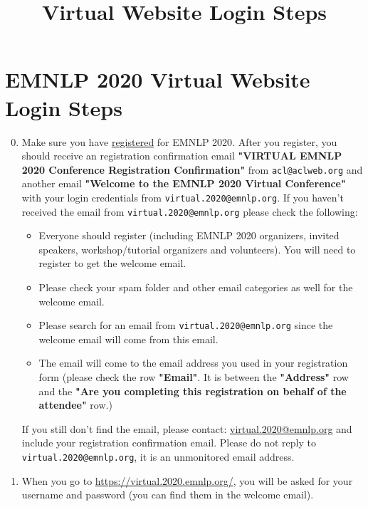 \documentclass[11pt]{scrartcl}
\title{\conferenceName Virtual Website Login Steps}
\makeatletter
\newcommand{\conferenceName}{EMNLP 2020\xspace}
\newcommand{\registrationUrl}{https://aclweb.org/conference/virtual-emnlp-2020-conference-registration/}
\newcommand{\virtualConferenceUrl}{https://virtual.2020.emnlp.org/}
\newcommand{\loginCredentialEmail}{virtual.2020@emnlp.org}
\newcommand{\helpdeskEmail}{virtual.2020@emnlp.org}
\makeatother
\begin{document}
\section*{\conferenceName Virtual Website Login Steps}
	
\begin{enumerate}
	\setcounter{enumi}{-1}
	\item
		\label{step:registration}
		\begin{sloppypar}
			Make sure you have \href{\registrationUrl}{registered} for \conferenceName. After you register, you should receive an registration confirmation email \textbf{"VIRTUAL \conferenceName Conference Registration Confirmation"} from \nolinkurl{acl@aclweb.org} and another email \textbf{"Welcome to the \conferenceName Virtual Conference"} with your login credentials from \nolinkurl{\loginCredentialEmail}. If you haven't received the email from \nolinkurl{\loginCredentialEmail} please check the following:
			
			\begin{itemize}
				\item Everyone should register (including \conferenceName organizers, invited speakers, workshop/tutorial organizers and volunteers). You will need to register to get the welcome email.
				\item Please check your spam folder and other email categories as well for the welcome email.
				\item Please search for an email from \nolinkurl{\loginCredentialEmail} since the welcome email will come from this email.
				\item The email will come to the email address you used in your registration form (please check the row \textbf{"Email"}. It is between the \textbf{"Address"} row and the \textbf{"Are you completing this registration on behalf of the attendee"} row.)
			\end{itemize}
		
			If you still don't find the email, please contact: \href{mailto:\helpdeskEmail}{\helpdeskEmail} and include your registration confirmation email. Please do not reply to \nolinkurl{\loginCredentialEmail}, it is an unmonitored email address.
		\end{sloppypar}
	\item
		\begin{sloppypar}
			When you go to \url{\virtualConferenceUrl}, you will be asked for your username and password (you can find them in the welcome email).
			

\end{sloppypar}
\end{enumerate}
\end{document}
